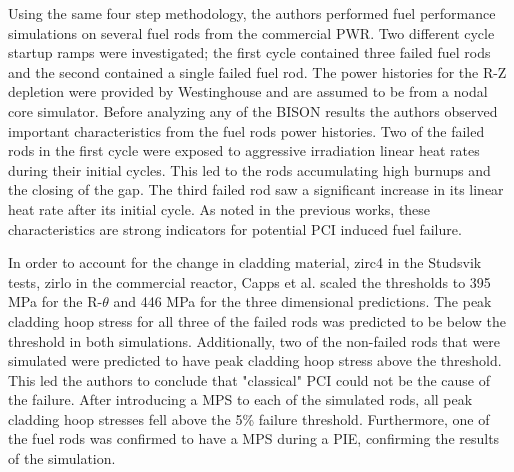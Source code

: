 \documentclass[edeposit,fullpage,12pt]{uiucthesis2009}
\begin{document}
Using the same four step methodology, the authors performed fuel performance simulations on several fuel rods from the commercial \gls{PWR}.
Two different cycle startup ramps were investigated; the first cycle contained three failed fuel rods and the second contained a single failed fuel rod.
The power histories for the R-Z depletion were provided by Westinghouse and are assumed to be from a nodal core simulator.
Before analyzing any of the BISON results the authors observed important characteristics from the fuel rods power histories.
Two of the failed rods in the first cycle were exposed to aggressive irradiation linear heat rates during their initial cycles.
This led to the rods accumulating high burnups and the closing of the gap.
The third failed rod saw a significant increase in its linear heat rate after its initial cycle.
As noted in the previous works, these characteristics are strong indicators for potential \gls{PCI} induced fuel failure. 

In order to account for the change in cladding material, zirc4 in the Studsvik tests, zirlo in the commercial reactor, Capps et al. scaled the thresholds to 395 MPa for the R-$\theta$ and 446 MPa for the three dimensional predictions.
The peak cladding hoop stress for all three of the failed rods was predicted to be below the threshold in both simulations.
Additionally, two of the non-failed rods that were simulated were predicted to have peak cladding hoop stress above the threshold. 
This led the authors to conclude that "classical" \gls{PCI} could not be the cause of the failure.
After introducing a \gls{MPS} to each of the simulated rods, all peak cladding hoop stresses fell above the 5\% failure threshold.
Furthermore, one of the fuel rods was confirmed to have a \gls{MPS} during a \gls{PIE}, confirming the results of the simulation.
\end{document}

